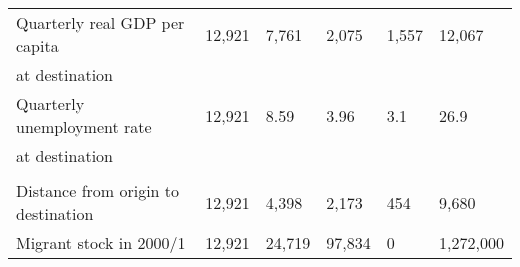 \begin{table}[htbp]
\begin{tabularx}{\textwidth}{l YYYYY }
\\
[0.3em]
Quarterly real GDP per capita  & 12,921 & 7,761 & 2,075 & 1,557 & 12,067  \\
at destination  & & & &  &   \\
[0.3em]
Quarterly unemployment rate & 12,921 & 8.59 & 3.96 & 3.1 & 26.9  \\
at destination  & & & &  &   \\
[0.3em]
\\
Distance from origin to destination & 12,921 & 4,398 & 2,173 & 454 & 9,680  \\
[0.3em]
Migrant stock in 2000/1 & 12,921 & 24,719 & 97,834 & 0 & 1,272,000  \\

\hline\end{tabularx}
\end{table}
